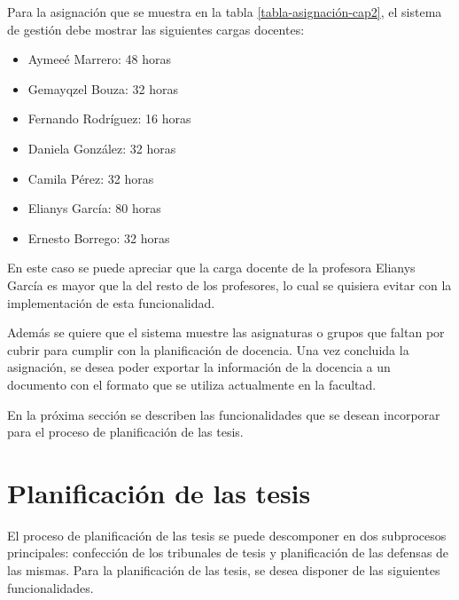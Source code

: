 Para la asignación que se muestra en la tabla \ref{tabla-asignación-cap2}, 
el sistema de gestión debe mostrar las siguientes cargas docentes:

\begin{multicols}{2}
    \begin{itemize}
        \item Aymeeé Marrero: 48 horas
        \item Gemayqzel Bouza: 32 horas 
        \item Fernando Rodríguez: 16 horas 
        \item Daniela González: 32 horas 
        \item Camila Pérez: 32 horas
        \item Elianys García: 80 horas
        \item Ernesto Borrego: 32 horas 
    \end{itemize}
\end{multicols}

En este caso se puede apreciar que la carga docente de la profesora 
Elianys García es mayor que la del resto de los profesores, lo cual se 
quisiera evitar con la implementación de esta funcionalidad. 


Además se quiere que el sistema muestre las asignaturas o 
grupos que faltan por cubrir para cumplir con la planificación de docencia. 
Una vez concluida la asignación, se desea poder exportar la información de la docencia a un documento con el 
formato que se utiliza actualmente en la facultad. 







En la próxima sección se describen las funcionalidades que se desean incorporar para el 
proceso de planificación de las tesis.


\section{Planificación de las tesis}\label{tesis:cap2}
El proceso de planificación de las tesis se puede descomponer en dos subprocesos principales: 
confección de los tribunales de tesis y planificación de las defensas de las mismas.
Para la planificación de las tesis, se desea disponer de las siguientes funcionalidades.



